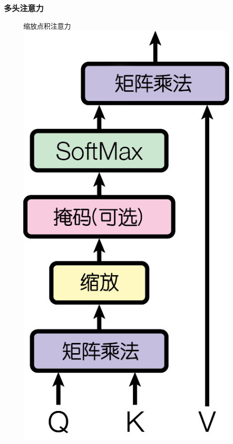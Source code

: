 \subsubsection{多头注意力} \label{sec:multihead}

\begin{figure}
\begin{minipage}[t]{0.5\textwidth}
  \centering
  缩放点积注意力 \\
  \vspace{0.5cm}
  \includegraphics[scale=0.6]{Figures/ModalNet-19}

\end{minipage}
\end{figure}
